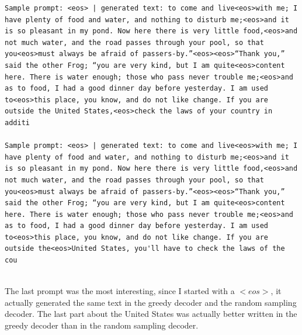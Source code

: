 \documentclass{article}
\begin{document}
\begin{lstlisting}
Sample prompt: <eos> | generated text: to come and live<eos>with me; I have plenty of food and water, and nothing to disturb me;<eos>and it is so pleasant in my pond. Now here there is very little food,<eos>and not much water, and the road passes through your pool, so that you<eos>must always be afraid of passers-by.”<eos><eos>“Thank you,” said the other Frog; “you are very kind, but I am quite<eos>content here. There is water enough; those who pass never trouble me;<eos>and as to food, I had a good dinner day before yesterday. I am used to<eos>this place, you know, and do not like change. If you are outside the United States,<eos>check the laws of your country in additi

Sample prompt: <eos> | generated text: to come and live<eos>with me; I have plenty of food and water, and nothing to disturb me;<eos>and it is so pleasant in my pond. Now here there is very little food,<eos>and not much water, and the road passes through your pool, so that you<eos>must always be afraid of passers-by.”<eos><eos>“Thank you,” said the other Frog; “you are very kind, but I am quite<eos>content here. There is water enough; those who pass never trouble me;<eos>and as to food, I had a good dinner day before yesterday. I am used to<eos>this place, you know, and do not like change. If you are outside the<eos>United States, you'll have to check the laws of the cou


\end{lstlisting}
The last prompt was the most interesting, since I started with a $<eos>$, it actually generated the same text in the greedy decoder and the random sampling decoder. The last part about the United States was actually better written in the greedy decoder than in the random sampling decoder.
\end{document}
